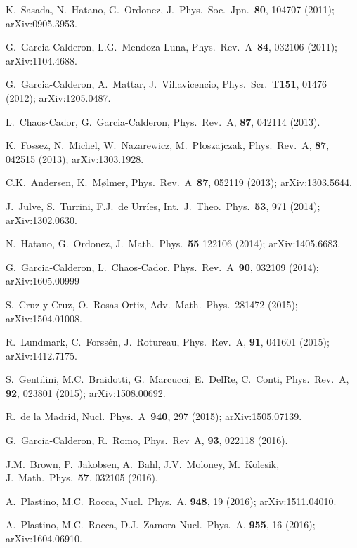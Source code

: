 \documentclass[12pt]{article}
\begin{document}
\begin{thebibliography}{99}
 K.~Sasada, N.~Hatano, G.~Ordonez, J.~Phys.~Soc.~Jpn.~{\bf 80},
104707 (2011); {\sf arXiv:0905.3953}.

 G.~Garcia-Calderon, L.G.~Mendoza-Luna, 
Phys.~Rev.~A~{\bf 84}, 032106 (2011); {\sf arXiv:1104.4688}.

 G.~Garcia-Calderon, A.~Mattar, J.~Villavicencio,
Phys.~Scr.~T{\bf 151}, 01476 (2012); {\sf arXiv:1205.0487}.

 L.~Chaos-Cador, G.~Garcia-Calderon, Phys.~Rev.~A,
{\bf 87}, 042114 (2013).

 K.~Fossez, N.~Michel, W.~Nazarewicz, M.~P{\l}oszajczak,
Phys.~Rev.~A, {\bf 87}, 042515 (2013); {\sf arXiv:1303.1928}.

 C.K.~Andersen, K.~M{\o}lmer, Phys.~Rev.~A~{\bf 87}, 
052119 (2013); {\sf arXiv:1303.5644}.

 J.~Julve, S.~Turrini, F.J.~de Urr{\'i}es,
Int.~J.~Theo.~Phys.~{\bf 53}, 971 (2014); {\sf arXiv:1302.0630}.

 N.~Hatano, G.~Ordonez, J.~Math.~Phys.~{\bf 55}
122106 (2014); {\sf arXiv:1405.6683}.

 G.~Garcia-Calderon, L.~Chaos-Cador,
Phys.~Rev.~A~{\bf 90}, 032109 (2014); {\sf arXiv:1605.00999}

 S.~Cruz y Cruz, O.~Rosas-Ortiz, 
Adv.~Math.~Phys.~281472 (2015); {\sf arXiv:1504.01008}.

 R.~Lundmark, C.~Forss\'en, J.~Rotureau, 
Phys.~Rev.~A, {\bf 91}, 041601 (2015); {\sf arXiv:1412.7175}.

 S.~Gentilini, M.C.~Braidotti, G.~Marcucci, 
E.~DelRe, C.~Conti, Phys.~Rev.~A, {\bf 92}, 023801 (2015);
{\sf arXiv:1508.00692}.

 R.~de la Madrid, Nucl.~Phys.~A~{\bf 940}, 297 (2015);
{\sf arXiv:1505.07139}.

 G.~Garcia-Calderon, R.~Romo, 
Phys.~Rev~A, {\bf 93}, 022118 (2016).

 J.M.~Brown, P.~Jakobsen, A.~Bahl, J.V.~Moloney, M.~Kolesik, 
J.~Math.~Phys.~{\bf 57}, 032105 (2016).

 A.~Plastino, M.C.~Rocca, 
Nucl.~Phys.~A, {\bf 948}, 19 (2016); {\sf arXiv:1511.04010}.

 A.~Plastino, M.C.~Rocca, D.J.~Zamora
Nucl.~Phys.~A, {\bf 955}, 16 (2016); {\sf arXiv:1604.06910}.


\end{thebibliography}
\end{document}
